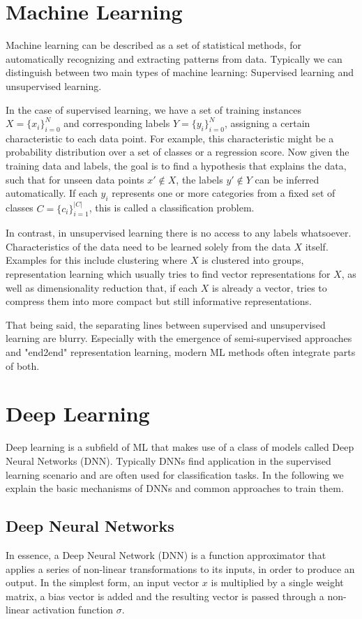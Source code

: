 \section{Machine Learning}
Machine learning can be described as a set of statistical methods, for automatically recognizing and extracting patterns from data. Typically we can distinguish between two main types of machine learning: Supervised learning and unsupervised learning.

In the case of supervised learning, we have a set of training instances $X = \{x_i\}_{i=0}^N$ and corresponding labels $Y = \{y_i\}_{i=0}^N$, assigning a certain characteristic to each data point. For example, this characteristic might be a probability distribution over a set of classes or a regression score. Now given the training data and labels, the goal is to find a hypothesis that explains the data, such that for unseen data points $x' \notin X$, the labels $y' \notin Y$ can be inferred automatically. If each $y_i$ represents one or more categories from a fixed set of classes $C = \{c_i\}_{i=1}^{|C|}$, this is called a classification problem.

In contrast, in unsupervised learning there is no access to any labels whatsoever. Characteristics of the data need to be learned solely from the data $X$ itself. Examples for this include clustering where $X$ is clustered into groups, representation learning which usually tries to find vector representations for $X$, as well as dimensionality reduction that, if each $X$ is already a vector, tries to compress them into more compact but still informative representations.

That being said, the separating lines between supervised and unsupervised learning are blurry. Especially with the emergence of semi-supervised approaches and "end2end" representation learning, modern ML methods often integrate parts of both.

\section{Deep Learning}
Deep learning is a subfield of ML that makes use of a class of models called Deep Neural Networks (DNN). Typically DNNs find application in the supervised learning scenario and are often used for classification tasks. In the following we explain the basic mechanisms of DNNs and common approaches to train them.

\subsection{Deep Neural Networks}
In essence, a Deep Neural Network (DNN) is a function approximator that applies a series of non-linear transformations to its inputs, in order to produce an output. In the simplest form, an input vector $x$ is multiplied by a single weight matrix, a bias vector is added and the resulting vector is passed through a non-linear activation function $\sigma$.

